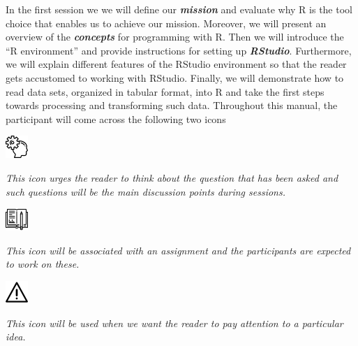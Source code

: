 \noindent In the first session we we will define our \textbf{\emph{mission}} and evaluate why R is the tool choice that enables us to achieve our mission. Moreover, we will present an overview of the \textbf{\emph{concepts}} for programming with R. Then we will introduce the ``R environment'' and provide instructions for setting up \textbf{\emph{RStudio}}. Furthermore, we will explain different features of the RStudio environment so that the reader gets accustomed to working with RStudio. Finally, we will demonstrate how to read data sets, organized in tabular format, into R and take the first steps towards processing and transforming such data.
Throughout this manual, the participant will come across the following two icons

\begin{minipage}[ht]{0.2\linewidth}
    \includegraphics[width=2\baselineskip]{./viz/icons/Think.png}  
\end{minipage}%
\begin{minipage}[ht]{0.75\linewidth}
\emph{This icon urges the reader to think about the question that has been asked and such questions will be the main discussion points during sessions.}
\end{minipage}

\begin{minipage}[ht]{0.2\linewidth}
    \includegraphics[width=2\baselineskip]{./viz/icons/Homework.png}  
\end{minipage}%
\begin{minipage}[ht]{0.75\linewidth}
\emph{This icon will be associated with an assignment and the participants are expected to work on these.}
\end{minipage}


\begin{minipage}[ht]{0.2\linewidth}
    \includegraphics[width=2\baselineskip]{./viz/icons/Warning.png}  
\end{minipage}%
\begin{minipage}[ht]{0.75\linewidth}
\emph{This icon will be used when we want the reader to pay attention to a particular idea.}
\end{minipage}

